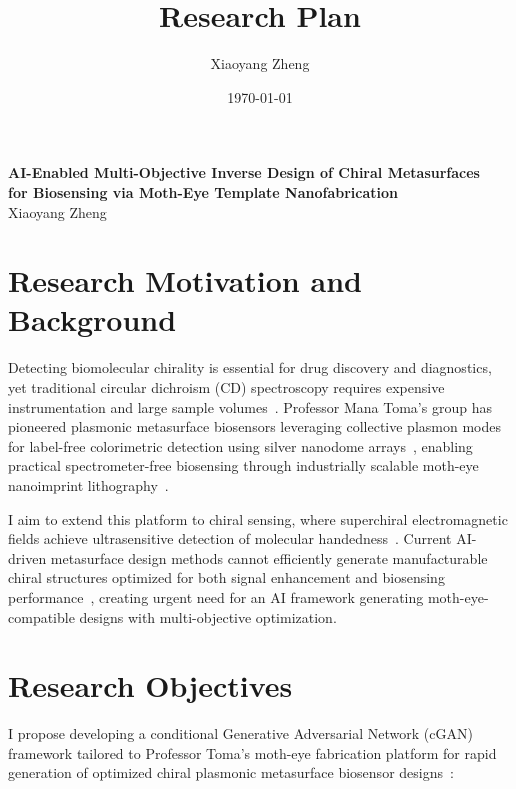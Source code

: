 \documentclass[11pt,a4paper]{article}
\title{Research Plan}
\author{Xiaoyang Zheng}
\date{\today}
\begin{document}
\begin{center}
    \Large \textbf{AI-Enabled Multi-Objective Inverse Design of Chiral Metasurfaces\\for Biosensing via Moth-Eye Template Nanofabrication}\\
    \vspace{4pt}
    \normalsize Xiaoyang Zheng
\end{center}
\vspace{4pt}

\section*{Research Motivation and Background}
Detecting biomolecular chirality is essential for drug discovery and diagnostics, yet traditional circular dichroism (CD) spectroscopy requires expensive instrumentation and large sample volumes~\cite{nanophotonic_biosensors_acs}. Professor Mana Toma's group has pioneered plasmonic metasurface biosensors leveraging collective plasmon modes for label-free colorimetric detection using silver nanodome arrays~\cite{toma_researches,toma_colorimetric_biosensor,toma_plasmonic_metasurface}, enabling practical spectrometer-free biosensing through industrially scalable moth-eye nanoimprint lithography~\cite{nil_metasurface_review}.

I aim to extend this platform to chiral sensing, where superchiral electromagnetic fields achieve ultrasensitive detection of molecular handedness~\cite{chiral_biosensing_review}. Current AI-driven metasurface design methods cannot efficiently generate manufacturable chiral structures optimized for both signal enhancement and biosensing performance~\cite{dl_nanophotonics_rg}, creating urgent need for an AI framework generating moth-eye-compatible designs with multi-objective optimization.

\section*{Research Objectives}
I propose developing a conditional Generative Adversarial Network (cGAN) framework tailored to Professor Toma's moth-eye fabrication platform for rapid generation of optimized chiral plasmonic metasurface biosensor designs~\cite{conditional_gan_nanophotonics,gan_nanophotonic_inverse}:
\end{document}
